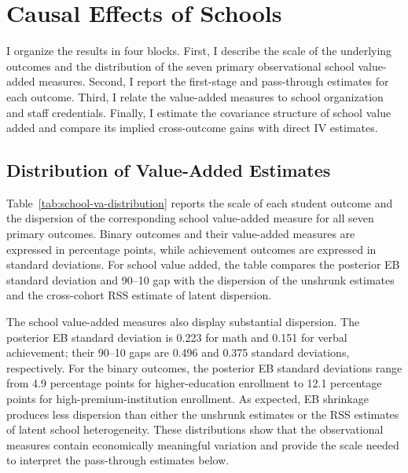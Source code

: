 \documentclass[a4paper, article, english, oneside, unknownkeysallowed, 12pt]{memoir}
\begin{document}
%


%



\section{Causal Effects of Schools}
\label{sec:results}

 I organize the results in four blocks. 
 First, I describe the scale of the underlying outcomes and the distribution of the seven primary observational school value-added measures. 
 Second, I report the first-stage and pass-through estimates for each outcome. 
 Third, I relate the value-added measures to school organization and staff credentials. 
 Finally, I estimate the covariance structure of school value added and compare its implied cross-outcome gains with direct IV estimates.

\subsection{Distribution of Value-Added Estimates}

Table~\ref{tab:school-va-distribution} reports the scale of each student outcome and the dispersion of the corresponding school value-added measure for all seven primary outcomes. Binary outcomes and their value-added measures are expressed in percentage points, while achievement outcomes are expressed in standard deviations. For school value added, the table compares the posterior EB standard deviation and 90--10 gap with the dispersion of the unshrunk estimates and the cross-cohort RSS estimate of latent dispersion.




The school value-added measures also display substantial dispersion.
The posterior EB standard deviation is 0.223 for math and 0.151 for verbal achievement; their 90--10 gaps are 0.496 and 0.375 standard deviations, respectively.
For the binary outcomes, the posterior EB standard deviations range from 4.9 percentage points for higher-education enrollment to 12.1 percentage points for high-premium-institution enrollment.
As expected, EB shrinkage produces less dispersion than either the unshrunk estimates or the RSS estimates of latent school heterogeneity.
These distributions show that the observational measures contain economically meaningful variation and provide the scale needed to interpret the pass-through estimates below.
\end{document}
